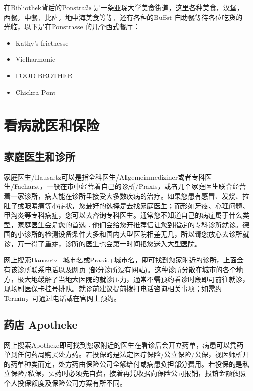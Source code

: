     在Bibliothek背后的Ponstraße 是一条亚琛大学美食街道，这里各种美食，汉堡，西餐，中餐，比萨，地中海美食等等，还有各种的Buffet 自助餐等待各位吃货的光临，以下是在Ponstrasse 的几个西式餐厅：

    \begin{itemize}
      \item Kathy’s frietnesse
      \item Vielharmonie 
      \item FOOD BROTHER
      \item Chicken Pont
    \end{itemize}

\section{看病就医和保险}

  \subsection{家庭医生和诊所}

    家庭医生/Hausartz可以是指全科医生/Allgemeinmediziner或者专科医生/Facharzt，一般在市中经营着自己的诊所/Praxis，或者几个家庭医生联合经营着一家诊所，病人能在诊所里接受大多数疾病的治疗。如果您患有感冒、发烧、拉肚子或眼睛痛等小症状，您最好的选择是去找家庭医生；而形如牙疼、心理问题、甲沟炎等专科病症，您可以去咨询专科医生。通常您不知道自己的病症属于什么类型，家庭医生会是您的首选：他们会给您开推荐信让您到指定的专科诊所就诊。德国的小诊所的检测设备条件大多和国内大型医院相差无几，所以请您放心去诊所就诊，万一得了重症，诊所的医生也会第一时间把您送入大型医院。

    网上搜索Hauszrtz+城市名或Praxis+城市名，即可找到您家附近的诊所，上面会有该诊所联系电话以及网页 (部分诊所没有网站)。这种诊所分散在城市的各个地方，极大地缓解了当地大医院的就诊压力，通常不需预约看诊时段即可前往就诊，现场刷医保卡挂号排队。就诊前建议提前拨打电话咨询相关事项；如需约Termin，可通过电话或在官网上预约。

  \subsection{药店 Apotheke}

    网上搜索Apotheke即可找到您家附近的医生在看诊后会开立药单，病患可以凭药单到任何药局购买处方药。若投保的是法定医疗保险/公立保险/公保，视医师所开的药单种类而定，处方药由保险公司全额给付或病患负担部分费用。若投保的是私立保险/私保，买药时必须先自费，接着再凭收据向保险公司报销，报销金额依照个人投保额度及保险公司方案有所不同。

